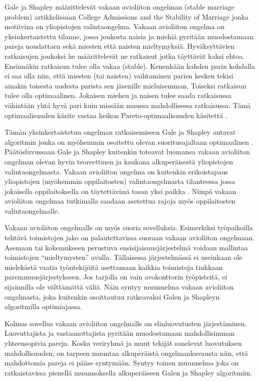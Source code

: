 \documentclass[gradu, twoside]{tktltiki}
\begin{document}
Gale ja Shapley määrittelevät vakaan avioliiton ongelman (stable
marriage problem) artikkelissaan College Admissions and the Stability
of Marriage \cite{galeshapley62} jonka motiivina on yliopistojen
valintaongelma. Vakaan avioliiton ongelma on yksinkertaistettu
tilanne, jossa joukosta naisia ja miehiä pyritään muodostamaan pareja
noudattaen sekä miesten että naisten mieltymyksiä. Hyväksyttävien
ratkaisujen joukoksi he määrittelevät ne ratkaisut jotka täyttävät
kaksi ehtoa. Ensinnäkin ratkaisun tulee olla vakaa (stable). Kenenkään
kahden parin kohdalla ei saa olla niin, että miesten (tai naisten)
vaihtaminen parien kesken tekisi ainakin toisesta uudesta parista sen
jäsenille mieluisemman. Toiseksi ratkaisun tulee olla optimaalinen.
Jokaisen miehen ja naisen tulee saada ratkaisussa vähintään yhtä hyvä
pari kuin missään muussa mahdollisessa ratkaisussa. Tämä
optimaalisuuden käsite vastaa heikon Pareto-optimaalisuuden käsitettä
\cite[sivu 13]{gusfield89}.

Tämän yksinkertaistetun ongelman ratkaisemiseen Gale ja Shapley
antavat algoritmin jonka on myöhemmin osoitettu olevan
suoritusajaltaan optimaalinen \cite{gusfield89, cheng89}.
Päätösluvussaan Gale ja Shapley kuitenkin toteavat luomansa vakaan
avioliiton ongelman olevan hyvin teoreettinen ja kaukana
alkuperäisestä yliopistojen valintaongelmasta. Vakaan avioliiton
ongelma on kuitenkin erikoistapaus yliopistojen (myöhemmin
oppilaitosten) valintaongelmasta tilanteessa jossa jokaisella
oppilaitoksella on täytettävänä tasan yksi paikka \cite{manlove02}.
Niinpä vakaan avioliiton ongelmaa tutkimalla saadaan asetettua rajoja
myös oppilaitosten valintaongelmalle.

Vakaan avioliiton ongelmalle on myös suoria sovelluksia. Esimerkiksi
työpaikoilla tehtävä toimistojen jako on palautettavissa suoraan
vakaan avioliiton ongelmaan. Asemaan tai kokemukseen perustuva
ensisijaisuusjärjestelmä voidaan mallintaa toimistojen
``mieltymysten'' avulla. Tällaisessa järjestelmässä ei useinkaan ole
mielekästä vaatia työntekijöitä asettamaan kaikkia toimistoja tiukkaan
paremmuusjärjestykseen. Jos tarjolla on vain avokonttorin työpisteitä,
ei sijainnilla ole välttämättä väliä. Näin syntyy muunnelma vakaan
avioliiton ongelmasta, joka kuitenkin osoittautuu ratkeavaksi Galen ja
Shapleyn algoritmilla optimiajassa.

Kolmas sovellus vakaan avioliiton ongelmalle on elinluovutusten
järjestäminen. Luovuttajista ja vastaanottajista pyritään muodostamaan
mahdollisimman yhteensopivia pareja. Koska veriryhmä ja muut tekijät
sanelevat luovutuksen mahdollisuuden, on tarpeen muuntaa alkuperäistä
ongelmankuvausta niin, että mahdottomia pareja ei pääse syntymään.
Syntyy toinen muunnelma joka on ratkaistavissa pienellä muunnoksella
alkuperäiseen Galen ja Shapley algoritmiin.
\end{document}

